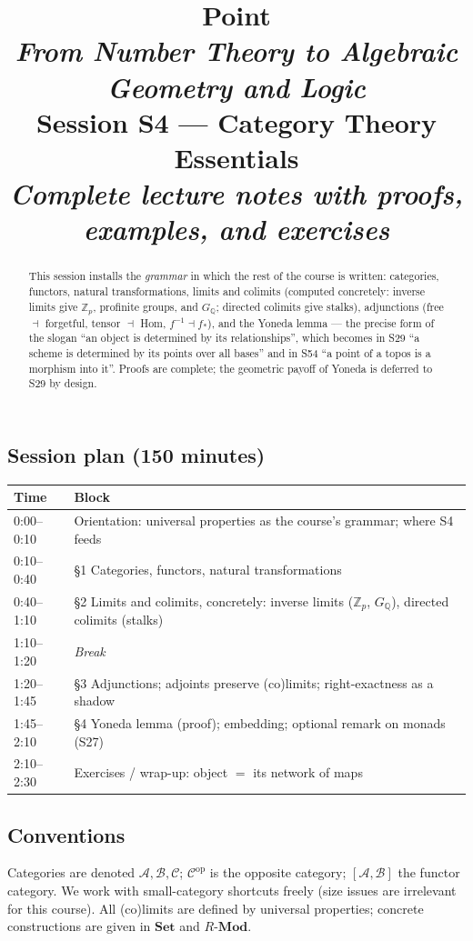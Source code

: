 \documentclass[11pt,a4paper]{article}
\title{
  {\color{blue!40!black}\textbf{\Huge Point}}\\[0.3em]
  \Large \textit{From Number Theory to Algebraic Geometry and Logic}\\[0.7em]
  \large \textbf{Session S4 --- Category Theory Essentials}\\[0.3em]
  \normalsize \emph{Complete lecture notes with proofs, examples, and exercises}
}
\author{}
\date{}
\theoremstyle{definition}
\newcommand{\Z}{\mathbb{Z}}
\newcommand{\Q}{\mathbb{Q}}
\newcommand{\Set}{\mathbf{Set}}
\begin{document}
\maketitle
\thispagestyle{empty}

\begin{abstract}
\noindent
This session installs the \emph{grammar} in which the rest of the course is written: categories,
functors, natural transformations, limits and colimits (computed concretely: inverse limits give
$\Z_p$, profinite groups, and $G_\Q$; directed colimits give stalks), adjunctions (free $\dashv$
forgetful, tensor $\dashv$ Hom, $f^{-1}\dashv f_*$), and the Yoneda lemma --- the precise form of
the slogan ``an object is determined by its relationships'', which becomes in S29 ``a scheme is
determined by its points over all bases'' and in S54 ``a point of a topos is a morphism into it''.
Proofs are complete; the geometric payoff of Yoneda is deferred to S29 by design.
\end{abstract}

\subsection*{Session plan (150 minutes)}
\begin{center}\small
\begin{tabular}{|l|l|}
\hline
\textbf{Time} & \textbf{Block} \\
\hline
0:00--0:10 & Orientation: universal properties as the course's grammar; where S4 feeds \\
0:10--0:40 & \S1 Categories, functors, natural transformations \\
0:40--1:10 & \S2 Limits and colimits, concretely: inverse limits ($\Z_p$, $G_\Q$), directed colimits (stalks) \\
1:10--1:20 & \emph{Break} \\
1:20--1:45 & \S3 Adjunctions; adjoints preserve (co)limits; right-exactness as a shadow \\
1:45--2:10 & \S4 Yoneda lemma (proof); embedding; optional remark on monads (S27) \\
2:10--2:30 & Exercises / wrap-up: object $=$ its network of maps \\
\hline
\end{tabular}
\end{center}

\subsection*{Conventions}
Categories are denoted $\mathcal A,\mathcal B,\mathcal C$; $\mathcal C^{\mathrm{op}}$ is the opposite
category; $[ \mathcal A,\mathcal B ]$ the functor category. We work with small-category shortcuts
freely (size issues are irrelevant for this course). All (co)limits are defined by universal
properties; concrete constructions are given in $\Set$ and $R\text{-}\mathbf{Mod}$.
\end{document}
